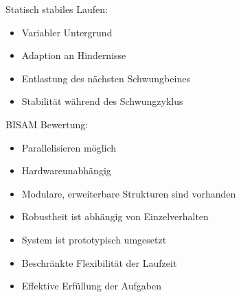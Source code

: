 Statisch stabiles Laufen:
\begin{itemize}
	\item Variabler Untergrund
	\item Adaption an Hindernisse
	\item Entlastung des nächsten Schwungbeines
	\item Stabilität während des Schwungzyklus
\end{itemize}

BISAM Bewertung:
\begin{itemize}
	\item Parallelisieren möglich
	\item Hardwareunabhängig
	\item Modulare, erweiterbare Strukturen sind vorhanden
	\item Robustheit ist abhängig von Einzelverhalten
	\item System ist prototypisch umgesetzt
	\item Beschränkte Flexibilität der Laufzeit
	\item Effektive Erfüllung der Aufgaben
\end{itemize}

